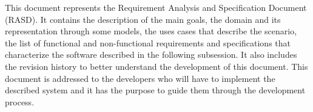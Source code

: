 This document represents the Requirement Analysis and Specification Document (RASD).
It contains the description of the main goals, the domain and its representation through some models, the uses cases that describe the scenario, the list of functional and non-functional requirements and specifications that characterize the software described in the following subsession.
It also includes the revision history to better understand the development of this document.
This document is addressed to the developers who will have to implement the described system and it has the purpose to guide them through the development process.